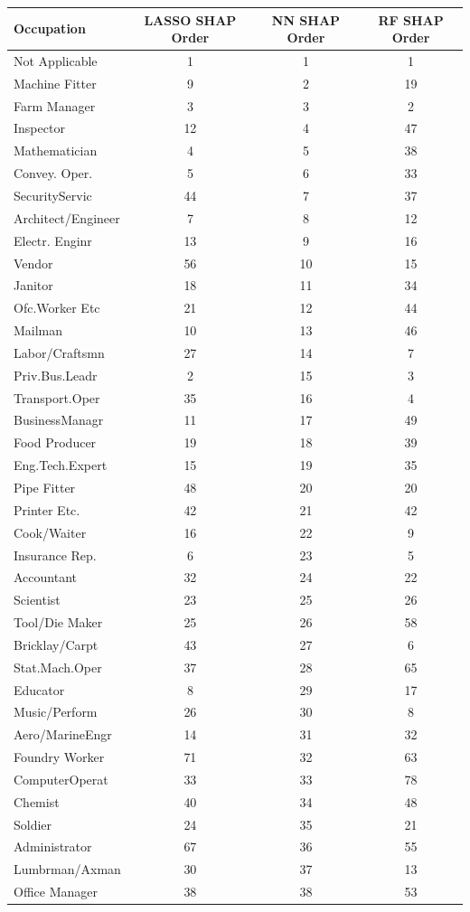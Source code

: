 \begin{tabular}{lccc}
\hline\hline
Occupation & LASSO SHAP Order & NN SHAP Order & RF SHAP Order \\
\hline
Not Applicable&1&1&1\\
Machine Fitter&9&2&19\\
Farm Manager&3&3&2\\
Inspector&12&4&47\\
Mathematician&4&5&38\\
Convey. Oper.&5&6&33\\
SecurityServic&44&7&37\\
Architect/Engineer&7&8&12\\
Electr. Enginr&13&9&16\\
Vendor&56&10&15\\
Janitor&18&11&34\\
Ofc.Worker Etc&21&12&44\\
Mailman&10&13&46\\
Labor/Craftsmn&27&14&7\\
Priv.Bus.Leadr&2&15&3\\
Transport.Oper&35&16&4\\
BusinessManagr&11&17&49\\
Food Producer&19&18&39\\
Eng.Tech.Expert&15&19&35\\
Pipe Fitter&48&20&20\\
Printer Etc.&42&21&42\\
Cook/Waiter&16&22&9\\
Insurance Rep.&6&23&5\\
Accountant&32&24&22\\
Scientist&23&25&26\\
Tool/Die Maker&25&26&58\\
Bricklay/Carpt&43&27&6\\
Stat.Mach.Oper&37&28&65\\
Educator&8&29&17\\
Music/Perform&26&30&8\\
Aero/MarineEngr&14&31&32\\
Foundry Worker&71&32&63\\
ComputerOperat&33&33&78\\
Chemist&40&34&48\\
Soldier&24&35&21\\
Administrator&67&36&55\\
Lumbrman/Axman&30&37&13\\
Office Manager&38&38&53\\

\end{tabular}
